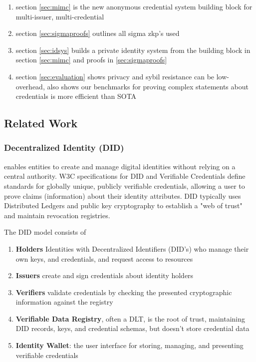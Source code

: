 \begin{enumerate}
    \item section \ref{sec:mimc} is the new anonymous credential system building block for multi-issuer, multi-credential
    \item section \ref{sec:sigmaproofs} outlines all sigma zkp's used
    \item section \ref{sec:idsys} builds a private identity system from the building block in section \ref{sec:mimc} and proofs in \ref{sec:sigmaproofs}
    \item section \ref{sec:evaluation} shows privacy and sybil resistance can be low-overhead, also shows our benchmarks for proving complex statements about credentials is more efficient than SOTA
\end{enumerate}


\subsection{Related Work}

\subsubsection{Decentralized Identity (DID)}
enables entities to create and manage digital identities without relying on a central authority. W3C specifications for DID and Verifiable Credentials define standards for globally unique, publicly verifiable credentials, allowing a user to prove claims (information) about their identity attributes. DID typically uses Distributed Ledgers and public key cryptography to establish a "web of trust" and maintain revocation registries. 

The DID model consists of 
\begin{enumerate}
    \item \textbf{Holders} Identities with Decentralized Identifiers (DID's) who manage their own keys, and credentials, and request access to resources
    
    \item \textbf{Issuers} create and sign credentials about identity holders
    
    \item \textbf{Verifiers} validate credentials by checking the presented cryptographic information against the registry

    \item  \textbf{Verifiable Data Registry}, often a DLT, is the root of trust, maintaining DID records, keys, and credential schemas, but doesn't store credential data
    
    \item \textbf{Identity Wallet}: the user interface for storing, managing, and presenting verifiable credentials
\end{enumerate}
 
